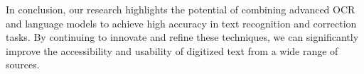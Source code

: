 In conclusion, our research highlights the potential of combining advanced OCR and language models to achieve high accuracy in text recognition and correction tasks. By continuing to innovate and refine these techniques, we can significantly improve the accessibility and usability of digitized text from a wide range of sources.